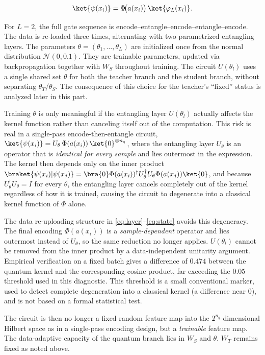 \begin{equation}
\label{eq:state}
\ket{\psi(x_i)} = \Phi\!\big(a(x_i)\big)\,\ket{\varphi_L(x_i)}.
\end{equation}

For $L=2$, the full gate sequence is encode--entangle--encode--entangle--encode.
The data is re-loaded three times, alternating with two parametrized
entangling layers. The parameters $\theta = (\theta_1,\ldots,\theta_L)$
are initialized once from the normal distribution $\mathcal{N}(0, 0.1)$.
They are trainable parameters, updated via backpropagation
together with $W_S$ throughout training. The circuit $U(\theta_l)$
uses a single shared set $\theta$ for both the teacher
branch and the student branch, without separating $\theta_T$/$\theta_S$.
The consequence of this choice for the teacher's ``fixed'' status is
analyzed later in this part.

Training $\theta$ is only meaningful if the entangling layer
$U(\theta_l)$ actually affects the kernel function rather than
canceling itself out of the computation. This risk is real in a
single-pass encode-then-entangle circuit,
$\ket{\psi(x_i)} = U_\theta\,\Phi(a(x_i))\,\ket{0}^{\otimes n_q}$,
where the entangling layer $U_\theta$ is an operator that is
\emph{identical for every sample} and lies outermost in the
expression. The kernel then depends only on the inner product
$\braket{\psi(x_i)|\psi(x_j)} = \bra{0}\Phi(a(x_i))^\dagger
U_\theta^\dagger U_\theta \Phi(a(x_j))\ket{0}$, and because
$U_\theta^\dagger U_\theta = I$ for every $\theta$, the entangling
layer cancels completely out of the kernel regardless of how it is
trained, causing the circuit to degenerate into a classical kernel
function of $\Phi$ alone.

The data re-uploading structure in \eqref{eq:layer}--\eqref{eq:state}
avoids this degeneracy. The final encoding $\Phi(a(x_i))$ is a
\emph{sample-dependent} operator and lies outermost instead of
$U_\theta$, so the same reduction no longer applies. $U(\theta_l)$
cannot be removed from the inner product by a data-independent
unitarity argument. Empirical verification on a fixed batch gives a
difference of $0.474$ between the quantum kernel and the
corresponding cosine product, far exceeding the $0.05$ threshold
used in this diagnostic. This threshold is a small conventional
marker, used to detect complete degeneration into a classical kernel
(a difference near 0), and is not based on a formal statistical
test.

The circuit is then no longer a fixed random feature map into the
$2^{n_q}$-dimensional Hilbert space as in a single-pass encoding
design, but a \emph{trainable} feature map. The data-adaptive
capacity of the quantum branch lies in $W_S$ and $\theta$. $W_T$
remains fixed as noted above.

